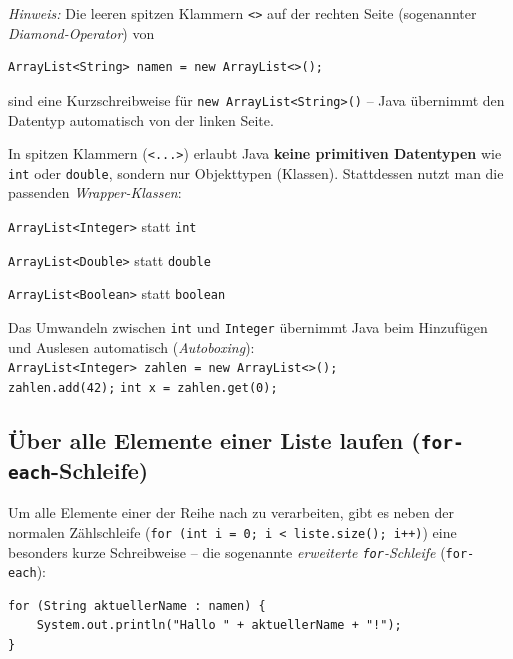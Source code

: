 \noindent \emph{Hinweis:} Die leeren spitzen Klammern \texttt{<>} auf der
rechten Seite (sogenannter \emph{Diamond-Operator}) von

\begin{lstlisting}
ArrayList<String> namen = new ArrayList<>();
\end{lstlisting}

sind eine Kurzschreibweise
für \lstinline|new ArrayList<String>()| -- Java übernimmt den Datentyp
automatisch von der linken Seite.

\begin{tcolorbox}[colback=orange!8,colframe=orange!80!black,boxrule=0.8pt,arc=3pt,title={\textbf{Wichtig bei Zahlen: Wrapper-Klassen verwenden!}}]
\small
In spitzen Klammern (\texttt{<...>}) erlaubt Java \textbf{keine primitiven
Datentypen} wie \lstinline|int| oder \lstinline|double|, sondern nur
Objekttypen (Klassen). Stattdessen nutzt man die passenden
\emph{Wrapper-Klassen}:
\begin{compactitem}
  \item \lstinline|ArrayList<Integer>| statt \lstinline|int|
  \item \lstinline|ArrayList<Double>| statt \lstinline|double|
  \item \lstinline|ArrayList<Boolean>| statt \lstinline|boolean|
\end{compactitem}
Das Umwandeln zwischen \lstinline|int| und \lstinline|Integer| übernimmt Java
beim Hinzufügen und Auslesen automatisch (\emph{Autoboxing}):\\
\lstinline|ArrayList<Integer> zahlen = new ArrayList<>();|\\
\lstinline|zahlen.add(42);| \quad \lstinline|int x = zahlen.get(0);|
\end{tcolorbox}


\subsection{Über alle Elemente einer Liste laufen (\texttt{for-each}-Schleife)}

Um alle Elemente einer  der Reihe nach zu verarbeiten, gibt
es neben der normalen Zählschleife (\lstinline|for (int i = 0; i < liste.size(); i++)|)
eine besonders kurze Schreibweise -- die sogenannte \emph{erweiterte
\texttt{for}-Schleife} (\texttt{for-each}):

\begin{lstlisting}
for (String aktuellerName : namen) {
    System.out.println("Hallo " + aktuellerName + "!");
}
\end{lstlisting}

